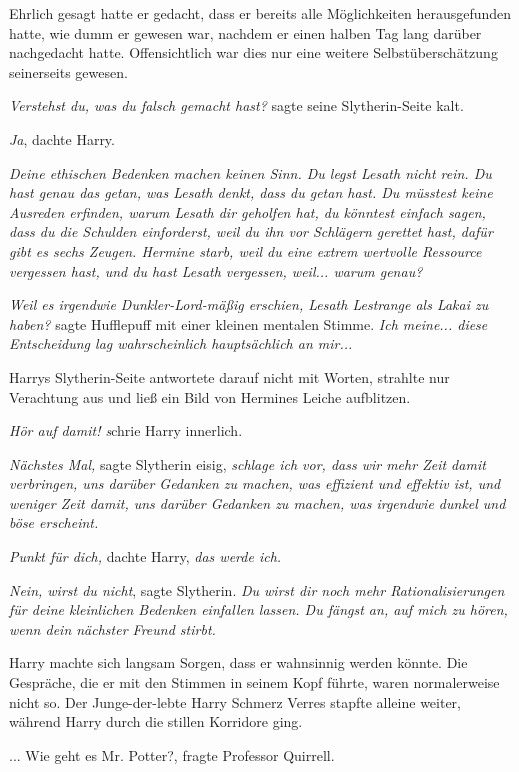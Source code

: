 Ehrlich gesagt hatte er gedacht, dass er bereits alle Möglichkeiten
herausgefunden hatte, wie dumm er gewesen war, nachdem er einen halben Tag lang
darüber nachgedacht hatte. Offensichtlich war dies nur eine weitere
Selbstüberschätzung seinerseits gewesen.

\emph{Verstehst du, was du falsch gemacht hast?} sagte seine Slytherin-Seite
kalt.

\emph{Ja}, dachte Harry.

\emph{Deine ethischen Bedenken machen keinen Sinn. Du legst Lesath nicht rein.
Du hast genau das getan, was Lesath denkt, dass du getan hast. Du müsstest keine
Ausreden erfinden, warum Lesath dir geholfen hat, du könntest einfach sagen,
dass du die Schulden einforderst, weil du ihn vor Schlägern gerettet hast, dafür
gibt es sechs Zeugen. Hermine starb, weil du eine extrem wertvolle Ressource
vergessen hast, und du hast Lesath vergessen, weil... warum genau?}

\emph{Weil es irgendwie Dunkler-Lord-mäßig erschien, Lesath Lestrange als Lakai
zu haben?} sagte Hufflepuff mit einer kleinen mentalen Stimme.\emph{ Ich
meine... diese Entscheidung lag wahrscheinlich hauptsächlich an mir...}

Harrys Slytherin-Seite antwortete darauf nicht mit Worten, strahlte nur
Verachtung aus und ließ ein Bild von Hermines Leiche aufblitzen.

\emph{Hör auf damit! s}chrie Harry innerlich.

\emph{Nächstes Mal,} sagte Slytherin eisig, \emph{schlage ich vor, dass wir mehr
Zeit damit verbringen, uns darüber Gedanken zu machen, was effizient und
effektiv ist, und weniger Zeit damit, uns darüber Gedanken zu machen, was
irgendwie dunkel und böse erscheint.}

\emph{Punkt für dich,} dachte Harry, \emph{das werde ich.}

\emph{Nein, wirst du nicht}, sagte Slytherin. \emph{Du wirst dir noch mehr
Rationalisierungen für deine kleinlichen Bedenken einfallen lassen. Du fängst
an, auf mich zu hören, wenn dein nächster Freund stirbt.}

Harry machte sich langsam Sorgen, dass er wahnsinnig werden könnte. Die
Gespräche, die er mit den Stimmen in seinem Kopf führte, waren normalerweise
nicht so. Der Junge-der-lebte Harry Schmerz Verres stapfte alleine weiter,
während Harry durch die stillen Korridore ging.

... \glqq{}Wie geht es Mr. Potter?\grqq{}, fragte Professor Quirrell.

